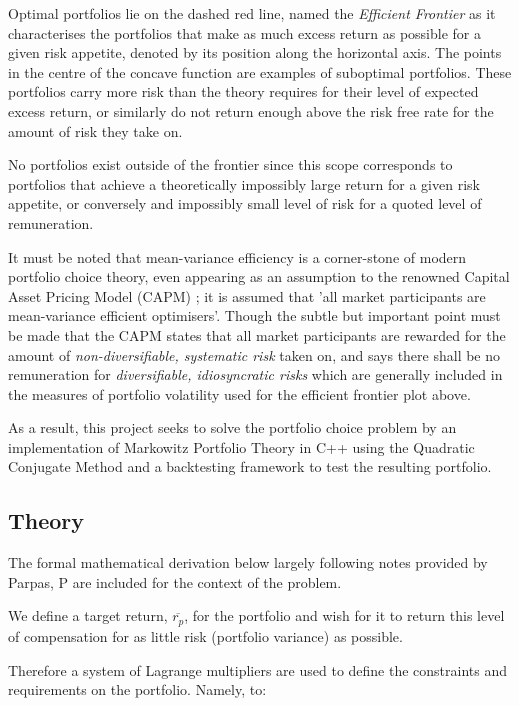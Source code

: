 \documentclass{article}
\begin{document}
Optimal portfolios lie on the dashed red line, named the \textit{Efficient Frontier} as it characterises the portfolios that make as much excess return as possible for a given risk appetite, denoted by its position along the horizontal axis. The points in the centre of the concave function are examples of suboptimal portfolios. These portfolios carry more risk than the theory requires for their level of expected excess return, or similarly do not return enough above the risk free rate for the amount of risk they take on.

No portfolios exist outside of the frontier since this scope corresponds to portfolios that achieve a theoretically impossibly large return for a given risk appetite, or conversely  and impossibly small level of risk for a quoted level of remuneration.


It must be noted that mean-variance efficiency is a corner-stone of modern portfolio choice theory, even appearing as an assumption to the renowned Capital Asset Pricing Model (CAPM) \cite{capm}; it is assumed that 'all market participants are mean-variance efficient optimisers'. Though the subtle but important point must be made that the CAPM states that all market participants are rewarded for the amount of \textit{non-diversifiable, systematic risk} taken on, and says there shall be no remuneration for \textit{diversifiable, idiosyncratic risks} which are generally included in the measures of portfolio volatility used for the efficient frontier plot above.


As a result, this project seeks to solve the portfolio choice problem by an implementation of Markowitz Portfolio Theory \cite{mpt} in C++ using the Quadratic Conjugate Method and a backtesting framework to test the resulting portfolio.



\subsection{Theory}
\label{sec:theory}

The formal mathematical derivation below largely following notes provided by Parpas, P \cite{notes} are included for the context of the problem.

We define a target return, $\overline{r_p}$, for the portfolio and wish for it to return this level of compensation for as little risk (portfolio variance) as possible. 

Therefore a system of Lagrange multipliers are used to define the constraints and requirements on the portfolio. Namely, to:
\end{document}
